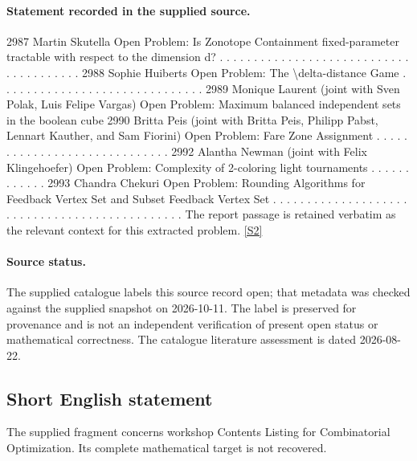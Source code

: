 \documentclass[11pt]{article}
\newcommand{\sref}[2]{\hyperlink{source:#1:#2}{[S#2]}}
\begin{document}
\paragraph{Statement recorded in the supplied source.}
2987 Martin Skutella Open Problem: Is Zonotope Containment fixed-parameter tractable with respect to the dimension d? . . . . . . . . . . . . . . . . . . . . . . . . . . . . . . . . . . . . . . . 2988 Sophie Huiberts Open Problem: The \textbackslash{}delta-distance Game . . . . . . . . . . . . . . . . . . . . . . . . . . . . . . 2989 Monique Laurent (joint with Sven Polak, Luis Felipe Vargas) Open Problem: Maximum balanced independent sets in the boolean cube 2990 Britta Peis (joint with Britta Peis, Philipp Pabst, Lennart Kauther, and Sam Fiorini) Open Problem: Fare Zone Assignment . . . . . . . . . . . . . . . . . . . . . . . . . . . . . 2992 Alantha Newman (joint with Felix Klingehoefer) Open Problem: Complexity of 2-coloring light tournaments . . . . . . . . . . . . 2993 Chandra Chekuri Open Problem: Rounding Algorithms for Feedback Vertex Set and Subset Feedback Vertex Set . . . . . . . . . . . . . . . . . . . . . . . . . . . . . . . . . . . . . . . . . . . . . . The report passage is retained verbatim as the relevant context for this extracted problem. \sref{statement}{2}
\paragraph{Source status.}
The supplied catalogue labels this source record open; that metadata was checked against the supplied snapshot on 2026-10-11. The label is preserved for provenance and is not an independent verification of present open status or mathematical correctness. The catalogue literature assessment is dated 2026-08-22.
\subsection{Short English statement}
The supplied fragment concerns workshop Contents Listing for Combinatorial Optimization. Its complete mathematical target is not recovered.
\end{document}
